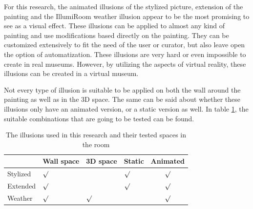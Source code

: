 \documentclass[a4paper]{article}
\begin{document}
For this research, the animated illusions of the stylized picture, extension of the painting and the IllumiRoom weather illusion appear to be the most promising to see as a visual effect. These illusions can be applied to almost any kind of painting and use modifications based directly on the painting. They can be customized extensively to fit the need of the user or curator, but also leave open the option of automatization. These illusions are very hard or even impossible to create in real museums. However, by utilizing the aspects of virtual reality, these illusions can be created in a virtual museum.

Not every type of illusion is suitable to be applied on both the wall around the painting as well as in the 3D space. The same can be said about whether these illusions only have an animated version, or a static version as well. In table \ref{tab:ourillusions}, the suitable combinations that are going to be tested can be found. 

\begin{table}
\centering
\begin{tabular}{ | l | >{\centering}p{1.7cm} >{\centering}p{1.7cm} | >{\centering}p{1.7cm} c | }
\hline
 & Wall space & 3D space & Static & Animated \\\hline
Stylized & $\surd$ &  & $\surd$ & $\surd$ \\
Extended & $\surd$ &  & $\surd$ & $\surd$ \\
Weather & $\surd$ & $\surd$ &  & $\surd$ \\\hline
\end{tabular}
\caption{\label{tab:ourillusions}The illusions used in this research and their tested spaces in the room}
\end{table}
\end{document}
